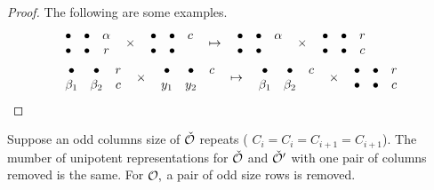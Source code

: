 \documentclass[11pt ,reqno]{amsart}
\begin{document}
\begin{proof}
The following are some examples.
$$
\begin{aligned}
&\begin{matrix}
    \bullet&\bullet&{\alpha}\\
  \bullet&\bullet&r\\
\end{matrix}
\quad\times\quad
\begin{matrix}
\bullet&\bullet&c\\
\bullet&\bullet&\\
\end{matrix}
\quad\mapsto\quad
\begin{matrix}
    \bullet&\bullet&{\alpha}\\
  \bullet&\bullet&
\end{matrix}
\quad\times\quad
\begin{matrix}
\bullet&\bullet&r\\
\bullet&\bullet&c\\ 
\end{matrix}
\\
&
\begin{matrix}
\bullet&\bullet&r\\
\beta_1&\beta_2&c
\end{matrix}
\quad\times\quad
\begin{matrix}
\bullet&\bullet&c\\
y_1&y_2&
\end{matrix}
\quad\mapsto\quad
\begin{matrix}
\bullet&\bullet&c\\
\beta_1&\beta_2&
\end{matrix}
\quad\times\quad
\begin{matrix}
\bullet&\bullet&r\\
\bullet&\bullet&c
\end{matrix}
\end{aligned}
$$
\end{proof}
\begin{proposition}
  \label{p:oddrows}
Suppose an odd columns size of ${\check {\mathcal O}}$ repeats (\ie
$C_i=C_i=C_{i+1}=C_{i+1}$). The mumber of unipotent representations
for ${\check {\mathcal O}}$ and ${\check {\mathcal O}}'$ with one pair of columns removed is the same. For
$\mathcal O,$ a pair of odd size rows is removed.
\end{proposition}
\end{document}
